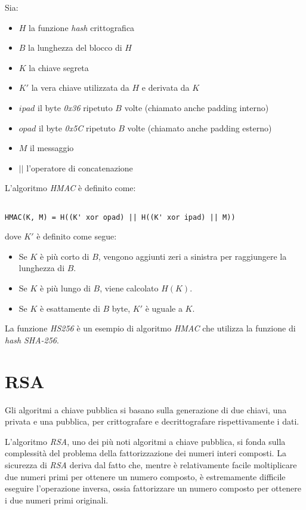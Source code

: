 \noindent Sia:
\begin{itemize}
	\item $H$ la funzione \emph{hash} crittografica
	\item $B$ la lunghezza del blocco di $H$
	\item $K$ la chiave segreta
	\item $K'$ la vera chiave utilizzata da $H$ e derivata da $K$
	\item $ipad$ il byte \emph{0x36} ripetuto $B$ volte (chiamato anche padding interno)
	\item $opad$ il byte \emph{0x5C} ripetuto $B$ volte (chiamato anche padding esterno)
	\item $M$ il messaggio
	\item $||$ l'operatore di concatenazione
\end{itemize}

\noindent L'algoritmo \emph{HMAC} è definito come:
\begin{verbatim}

HMAC(K, M) = H((K' xor opad) || H((K' xor ipad) || M))

\end{verbatim}
dove $K'$ è definito come segue:
\begin{itemize}
	\item Se $K$ è più corto di $B$, vengono aggiunti zeri a sinistra per raggiungere la lunghezza di $B$.
	\item Se $K$ è più lungo di $B$, viene calcolato $H(K)$.
	\item Se $K$ è esattamente di $B$ byte, $K'$ è uguale a $K$.
\end{itemize}

La funzione \emph{HS256} è un esempio di algoritmo \emph{HMAC} che utilizza la funzione di \emph{hash} \emph{SHA-256}.


\section{RSA}
Gli algoritmi a chiave pubblica si basano sulla generazione di due chiavi, una privata e una pubblica, per crittografare e decrittografare rispettivamente i dati.

L'algoritmo \emph{RSA}, uno dei più noti algoritmi a chiave pubblica, si fonda sulla complessità del problema della fattorizzazione dei numeri interi composti.
La sicurezza di \emph{RSA} deriva dal fatto che, mentre è relativamente facile moltiplicare due numeri primi per ottenere un numero composto, è estremamente difficile eseguire l'operazione inversa, ossia fattorizzare un numero composto per ottenere i due numeri primi originali.

